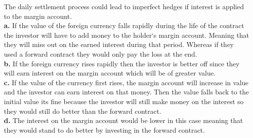 \documentclass[12pt]{article}
\newenvironment{problem}[3][Problem]{\begin{trivlist}
\item[\hskip \labelsep {\bfseries #1}\hskip \labelsep {\bfseries #2.}]}{\end{trivlist}}
\begin{document}
\begin{problem}{5.17}. The daily settlement process could lead to imperfect hedges if interest is applied to the margin account. \\
\textbf{a.} If  the value of the foreign currency falls rapidly during the life of the contract the investor will have to add money to the holder`s margin account. Meaning that they will miss out on the earned interest during that period. Whereas if they used a forward contract they would only pay the loss at the end. \\
\textbf{b.} If the foreign currency rises rapidly then the investor is better off since they will earn interest on the margin account which will be of greater value. \\
\textbf{c.} If the value of the currency first rises, the margin account will increase in value and the investor can earn interest on that money. Then the value falls back to the initial value its fine because the investor will still make money on the interest so they would still do better than the forward contract. \\
\textbf{d.} The interest on the margin account would be lower in this case meaning that they would stand to do better by investing in the forward contract. 
\end{problem}
\end{document}
